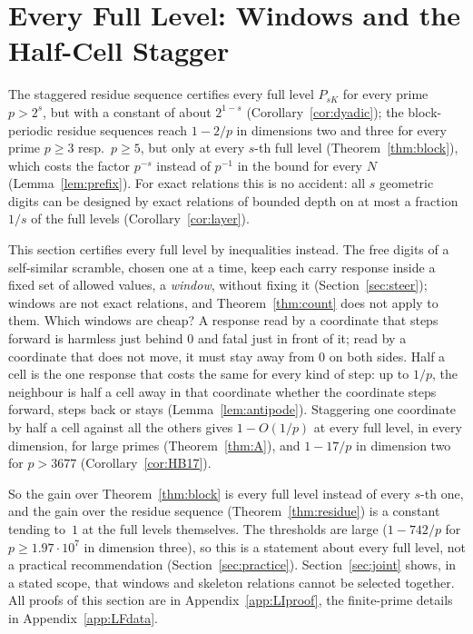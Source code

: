 %
%
%
%
%
%
%
\section{Every Full Level: Windows and the Half-Cell Stagger}\label{sec:antipode}
The staggered residue sequence certifies every full level $P_{sK}$ for every prime $p>2^s$, but with a constant of about $2^{1-s}$ (Corollary~\ref{cor:dyadic}); the block-periodic residue sequences reach $1-2/p$ in dimensions two and three for every prime $p\ge3$ resp.\ $p\ge5$, but only at every $s$-th full level (Theorem~\ref{thm:block}), which costs the factor $p^{-s}$ instead of $p^{-1}$ in the bound for every $N$ (Lemma~\ref{lem:prefix}). For exact relations this is no accident: all $s$ geometric digits can be designed by exact relations of bounded depth on at most a fraction $1/s$ of the full levels (Corollary~\ref{cor:layer}).

This section certifies every full level by inequalities instead. The free digits of a self-similar scramble, chosen one at a time, keep each carry response inside a fixed set of allowed values, a \emph{window}, without fixing it (Section~\ref{sec:steer}); windows are not exact relations, and Theorem~\ref{thm:count} does not apply to them. Which windows are cheap? A response read by a coordinate that steps forward is harmless just behind $0$ and fatal just in front of it; read by a coordinate that does not move, it must stay away from $0$ on both sides. Half a cell is the one response that costs the same for every kind of step: up to $1/p$, the neighbour is half a cell away in that coordinate whether the coordinate steps forward, steps back or stays (Lemma~\ref{lem:antipode}). Staggering one coordinate by half a cell against all the others gives $1-O(1/p)$ at every full level, in every dimension, for large primes (Theorem~\ref{thm:A}), and $1-17/p$ in dimension two for $p>3677$ (Corollary~\ref{cor:HB17}).

So the gain over Theorem~\ref{thm:block} is every full level instead of every $s$-th one, and the gain over the residue sequence (Theorem~\ref{thm:residue}) is a constant tending to~$1$ at the full levels themselves. The thresholds are large ($1-742/p$ for $p\ge1.97\cdot10^7$ in dimension three), so this is a statement about every full level, not a practical recommendation (Section~\ref{sec:practice}). Section~\ref{sec:joint} shows, in a stated scope, that windows and skeleton relations cannot be selected together. All proofs of this section are in Appendix~\ref{app:LIproof}, the finite-prime details in Appendix~\ref{app:LFdata}.


